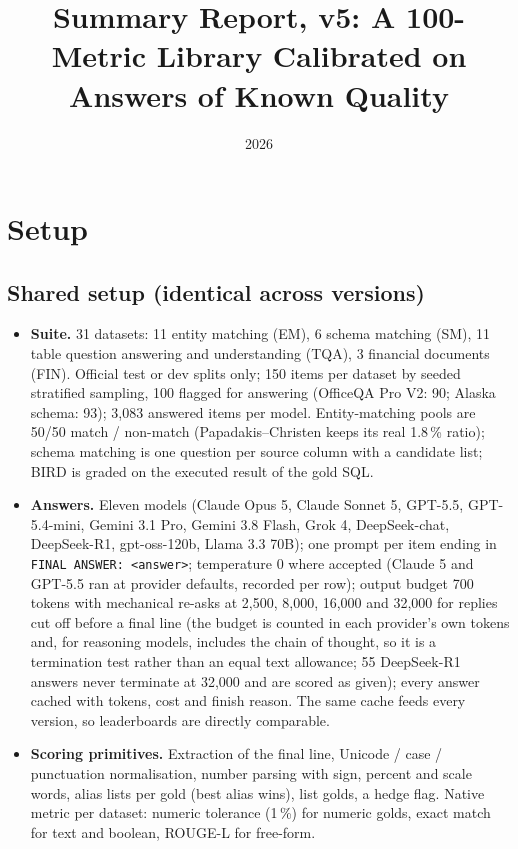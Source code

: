 \documentclass[11pt]{article}
\title{Summary Report, v5: A 100-Metric Library Calibrated on Answers of Known Quality}
\author{}
\date{2026}
\begin{document}
\maketitle

\section{Setup}

\subsection{Shared setup (identical across versions)}
\begin{itemize}
\item \textbf{Suite.} 31 datasets: 11 entity matching (EM), 6 schema matching (SM), 11 table question answering and understanding (TQA), 3 financial documents (FIN). Official test or dev splits only; 150 items per dataset by seeded stratified sampling, 100 flagged for answering (OfficeQA Pro V2: 90; Alaska schema: 93); 3,083 answered items per model. Entity-matching pools are 50/50 match / non-match (Papadakis--Christen keeps its real 1.8\,\% ratio); schema matching is one question per source column with a candidate list; BIRD is graded on the executed result of the gold SQL.
\item \textbf{Answers.} Eleven models (Claude Opus 5, Claude Sonnet 5, GPT-5.5, GPT-5.4-mini, Gemini 3.1 Pro, Gemini 3.8 Flash, Grok 4, DeepSeek-chat, DeepSeek-R1, gpt-oss-120b, Llama 3.3 70B); one prompt per item ending in \texttt{FINAL ANSWER: <answer>}; temperature 0 where accepted (Claude 5 and GPT-5.5 ran at provider defaults, recorded per row); output budget 700 tokens with mechanical re-asks at 2,500, 8,000, 16,000 and 32,000 for replies cut off before a final line (the budget is counted in each provider's own tokens and, for reasoning models, includes the chain of thought, so it is a termination test rather than an equal text allowance; 55 DeepSeek-R1 answers never terminate at 32,000 and are scored as given); every answer cached with tokens, cost and finish reason. The same cache feeds every version, so leaderboards are directly comparable.
\item \textbf{Scoring primitives.} Extraction of the final line, Unicode / case / punctuation normalisation, number parsing with sign, percent and scale words, alias lists per gold (best alias wins), list golds, a hedge flag. Native metric per dataset: numeric tolerance (1\,\%) for numeric golds, exact match for text and boolean, ROUGE-L for free-form.

\end{itemize}
\end{document}
